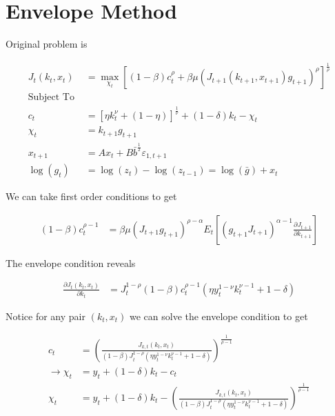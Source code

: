 \documentclass[10pt]{article}
\newcommand{\fracpd}[2]{
  \ensuremath{\frac{\partial #1}{\partial #2}}
}
\begin{document}
\section{Envelope Method}
  Original problem is

  \begin{align*}
    J_t(k_t, x_t) &= \max_{\chi_{t}} \left[(1 - \beta) c_t^{\rho} + \beta \mu(J_{t+1}(k_{t+1}, x_{t+1}) g_{t+1})^{\rho} \right]^{\frac1\rho} \\
    \text{Subject To }& \\
    c_t &= \left[ \eta k_{t}^{\nu} + (1 - \eta) \right]^{\frac1\nu} + (1 - \delta) k_t - \chi_t \\
    \chi_t &= k_{t+1} g_{t+1} \\
    x_{t+1} &= A x_{t} + B \bar{b}^{\frac{1}{2}} \varepsilon_{1, t+1} \\
    \log(g_t) &= \log(z_t) - \log(z_{t-1}) = \log(\bar{g}) + x_t
  \end{align*}

  We can take first order conditions to get

  \begin{align*}
    (1 - \beta) c_t^{\rho - 1} &= \beta \mu(J_{t+1} g_{t+1})^{\rho - \alpha} E_t \left[ (g_{t+1} J_{t+1})^{\alpha - 1} \fracpd{J_{t+1}}{k_{t+1}} \right]
  \end{align*}

  The envelope condition reveals

  \begin{align*}
    \fracpd{J_t(k_t, x_t)}{k_t} &= J_t^{1 - \rho} (1 - \beta) c_t^{\rho - 1} (\eta y_t^{1 - \nu} k_t^{\nu - 1} + 1 - \delta)
  \end{align*}

  Notice for any pair $(k_t, x_t)$ we can solve the envelope condition to get

  \begin{align*}
    c_t &= \left( \frac{J_{k, t}(k_t, x_t)}{(1 - \beta) J_t^{1 - \rho} (\eta y_t^{1 - \nu} k_t^{\nu - 1} + 1 - \delta)} \right)^{\frac{1}{\rho - 1}} \\
    \rightarrow \chi_t &= y_t + (1 - \delta) k_t - c_t \\
    \chi_t &= y_t + (1 - \delta) k_t - \left( \frac{J_{k, t}(k_t, x_t)}{(1 - \beta) J_t^{1 - \rho} (\eta y_t^{1 - \nu} k_t^{\nu - 1} + 1 - \delta)} \right)^{\frac{1}{\rho - 1}} \\
  \end{align*}
\end{document}
